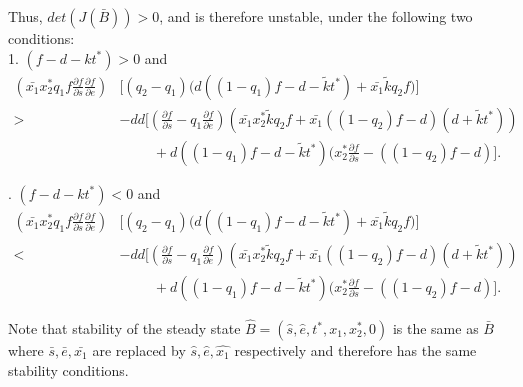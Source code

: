 \documentclass[12pt]{article}
\begin{document}
\noindent Thus, $det(J(\bar{B}))>0$, and is therefore unstable, under the following two conditions: \\
1. $(f-d-kt^*)>0$ and
\begin{align*}
(\bar{x_1} x_2^* q_1 f \frac{\partial f}{\partial s} \frac{\partial f}{\partial e})&\Big[(q_2-q_1)\big( d((1-q_1)f-d-\tilde{k} t^*)+\bar{x_1}\tilde{k} q_2 f \big) \Big] \\ >& -dd \Big[(\frac{\partial f}{\partial s} - q_1 \frac{\partial f}{\partial e})(\bar{x_1} x_2^* \tilde{k} q_2 f + \bar{x_1}((1-q_2)f-d)(d+\tilde{k} t^*))
\\&\hspace{1cm}  + d((1-q_1)f-d-\tilde{k} t^*)(x_2^* \frac{\partial f}{\partial s}-((1-q_2)f-d)\Big].
\end{align*}

. $(f-d-kt^*)<0$ and 
\begin{align*}
(\bar{x_1} x_2^* q_1 f \frac{\partial f}{\partial s} \frac{\partial f}{\partial e})&\Big[(q_2-q_1)\big( d((1-q_1)f-d-\tilde{k} t^*)+\bar{x_1}\tilde{k} q_2 f \big) \Big] \\ <& -dd \Big[(\frac{\partial f}{\partial s} - q_1 \frac{\partial f}{\partial e})(\bar{x_1} x_2^* \tilde{k} q_2 f + \bar{x_1}((1-q_2)f-d)(d+\tilde{k} t^*))
\\&\hspace{1cm}  + d((1-q_1)f-d-\tilde{k} t^*)(x_2^* \frac{\partial f}{\partial s}-((1-q_2)f-d)\Big].
\end{align*}

\noindent Note that stability of the steady state $\hat{B}=(\hat{s}, \hat{e}, t^*, \hat{x_1}, x_2^*, 0)$ is the same as $\bar{B}$ where $\bar{s}, \bar{e}, \bar{x_1}$ are replaced by $\hat{s}, \hat{e}, \hat{x_1}$ respectively and therefore has the same stability conditions.
\end{document}

